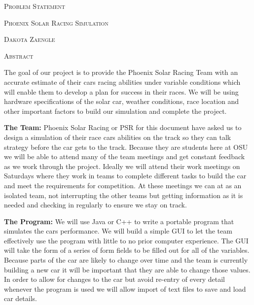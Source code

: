 \documentclass[10pt]{IEEEtran}
\begin{document}
\begin{titlepage}
\centering
{\scshape\Large Problem Statement \par}
\vspace{0.5cm}
{\scshape\LARGE Phoenix Solar Racing Simulation \par}
\vspace{1.5cm}
{\scshape\Large Dakota Zaengle \par}
\vspace{0.5cm}
{\scshape\small Abstract \par}
\vspace{0.2cm}

The goal of our project is to provide the Phoenix Solar Racing Team with an accurate estimate of their cars racing abilities under variable conditions which will enable them to develop a plan for success in their races. We will be using hardware specifications of the solar car, weather conditions, race location and other important factors to build our simulation and complete the project.

\end{titlepage}

\textbf{The Team:}
Phoenix Solar Racing or PSR for this document have asked us to design a simulation of their race cars abilities on the track so they can talk strategy before the car gets to the track. Because they are students here at OSU we will be able to attend many of the team meetings and get constant feedback as we work through the project. Ideally we will attend their work meetings on Saturdays where they work in teams to complete different tasks to build the car and meet the requirements for competition. At these meetings we can at as an isolated team, not interrupting the other teams but getting information as it is needed and checking in regularly to ensure we stay on track.

\textbf{The Program:}
We will use Java or C++ to write a portable program that simulates the cars performance. We will build a simple GUI to let the team effectively use the program with little to no prior computer experience. The GUI will take the form of a series of form fields to be filled out for all of the variables. Because parts of the car are likely to change over time and the team is currently building a new car it will be important that they are able to change those values. In order to allow for changes to the car but avoid re-entry of every detail whenever the program is used we will allow import of text files to save and load car details.
\end{document}
